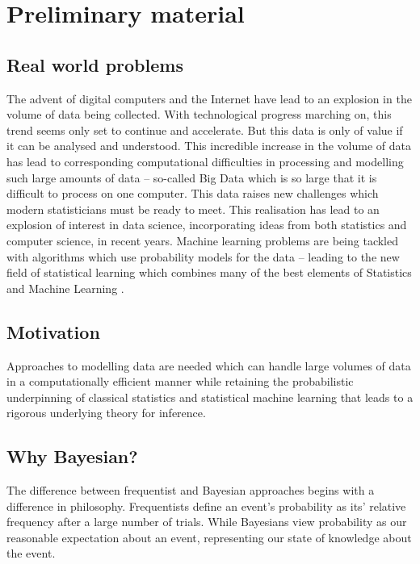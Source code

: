 \chapter{Preliminary material}

\section{Real world problems}

The advent of digital computers and the Internet have lead to an explosion in the volume of data being
collected. With technological progress marching on, this trend seems only set to continue and accelerate. But
this data is only of value if it can be analysed and understood.  This incredible increase in the volume of
data has lead to corresponding computational difficulties in processing and modelling such large amounts of
data -- so-called Big Data which is so large that it is difficult to process on one computer. This data raises
new challenges which modern statisticians must be ready to meet. This realisation has lead to an explosion of
interest in data science, incorporating ideas from both statistics and computer science, in recent years.
Machine learning problems are being tackled with algorithms which use probability models for the data --
leading to the new field of statistical learning which combines many of the best elements of Statistics and
Machine Learning \citep{James:2014:ISL:2517747} \citep{MacKay:2002:ITI:971143}
\citep{hastie01statisticallearning} \citep{Murphy:2012:MLP:2380985}.

\section{Motivation}

Approaches to modelling data are needed which can handle large volumes of data in a computationally
efficient manner while retaining the probabilistic underpinning of classical statistics and statistical machine
learning that leads to a rigorous underlying theory for inference.


\section{Why Bayesian?}
The difference between frequentist and Bayesian approaches begins with a difference in philosophy.
Frequentists define an event's probability as its' relative frequency after a large number of trials.
While Bayesians view probability as our reasonable expectation about an event, representing our state of knowledge about the event.

